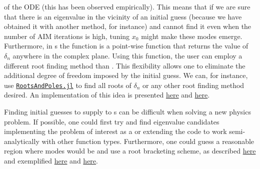 of the ODE (this has been observed empirically). This means that if we are sure that there is an eigenvalue in the vicinity of an initial guess (because we have obtained it with another method, for instance) and  cannot find it even when the number of AIM iterations is high, tuning $x_0$ might make these modes emerge. Furthermore, in s the function  is a point-wise function that returns the value of $\delta_n$ anywhere in the complex plane. Using this function, the user can employ a different root finding method than . This flexibility allows one to eliminate the additional degree of freedom imposed by the initial guess. We can, for instance, use \href{https://github.com/fgasdia/RootsAndPoles.jl}{\texttt{RootsAndPoles.jl}} to find all roots of $\delta_n$ or any other root finding method desired. An implementation of this idea is presented \href{https://github.com/lucass-carneiro/QuasinormalModes.jl/blob/master/examples/schwarzschild_roots_and_poles.jl}{here} and \href{https://github.com/lucass-carneiro/QuasinormalModes.jl/blob/master/examples/harmonic_oscillator_roots_and_poles.jl}{here}.

Finding initial guesses to supply to s can be difficult when solving a new physics problem. If possible, one could first try and find eigenvalue candidates implementing the problem of interest as a  or extending the code to work semi-analytically with other function types. Furthermore, one could guess a reasonable region where modes would be and use a root bracketing scheme, as described \href{https://lucass-carneiro.github.io/QuasinormalModes.jl/dev/schw/#Interpreting-SolverResults-output}{here} and exemplified \href{https://github.com/lucass-carneiro/QuasinormalModes.jl/blob/master/examples/harmonic_oscillator_roots_and_poles.jl}{here} and \href{https://github.com/lucass-carneiro/QuasinormalModes.jl/blob/master/examples/schwarzschild_roots_and_poles.jl}{here}.